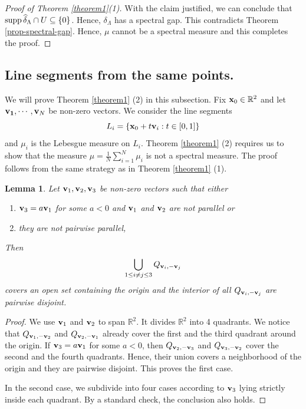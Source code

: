 \documentclass[12pt,a4paper,oneside]{amsart}
\newtheorem{lemma}{Lemma}
\theoremstyle{definition}
\newcommand{\RR}{{\mathbb R}}
\newcommand{\supp}{{\rm supp\,}}
\newcommand{\ft}[1]{\widehat{#1}}
\newcounter{rem}
\begin{document}
\begin{proof}[Proof of Theorem \ref{theorem1}(1)]
With the claim justified, we can conclude that $\supp\ft\delta_\Lambda \cap U \subseteq \{0\}$. Hence, $\delta_{\Lambda}$ has a spectral gap. This contradicts Theorem \ref{prop-spectral-gap}.  Hence, $\mu$ cannot be a spectral measure and this completes the proof.
\end{proof}

\subsection{Line segments from the same points.} We will prove Theorem \ref{theorem1} (2) in this subsection. Fix ${\bf x}_0\in \RR^2$ and {let} ${\bf v_1},\cdots, {\bf v}_N$ be non-zero vectors. We consider the {line segments}
$$
L_i = \{{\bf x}_0+t{\bf v}_i: t\in[0,1]\}
$$
and $\mu_i$ {is} the Lebesgue measure on $L_i$. Theorem \ref{theorem1} (2) requires us to show that the measure $\mu = \frac{1}{N} \sum_{i=1}^N \mu_i$ is not a spectral measure. The proof follows from the same strategy {as} in Theorem \ref{theorem1} (1). 



\begin{lemma}\label{lemma-covering2}
    Let  ${\bf v}_1,{\bf v}_2,{\bf v}_3$ be non-zero vectors such that either
    \begin{enumerate}
        \item ${\bf v}_3 = a{\bf v}_1$ for some $a<0$ and ${\bf v}_1$ and ${\bf v}_2$ are not parallel or 
         \item   they are not pairwise parallel,
    \end{enumerate}
 Then 
    $$
    \bigcup_{1\le i\ne j\le 3}Q_{{\bf v}_i,-{\bf v}_j}
    $$
    covers an open set containing the origin and  the interior of all $Q_{{\bf v}_i,-{\bf v}_j}$ are pairwise disjoint. 
\end{lemma}

\begin{proof} We use ${\bf v}_1$ and ${\bf v}_2$ to span $\RR^2$. It divides $\RR^2$ into 4 quadrants. We notice that $Q_{{\bf v}_1,-{\bf v}_2}$ and $Q_{{\bf v}_2,-{\bf v}_1}$ already cover the first and the third quadrant around the origin. If ${\bf v}_3 = a{\bf v}_1$ for some $a<0$, then  $Q_{{\bf v}_2,-{\bf v}_3}$ and $Q_{{\bf v}_3,-{\bf v}_2}$ cover the second and the fourth quadrants. Hence, their union covers a neighborhood of the origin and they are pairwise disjoint.  This proves the first case.

In the second case, we subdivide into four cases according to  ${\bf v}_3$ lying strictly inside each quadrant. By a standard check, the conclusion also holds. 
\end{proof}
\end{document}
